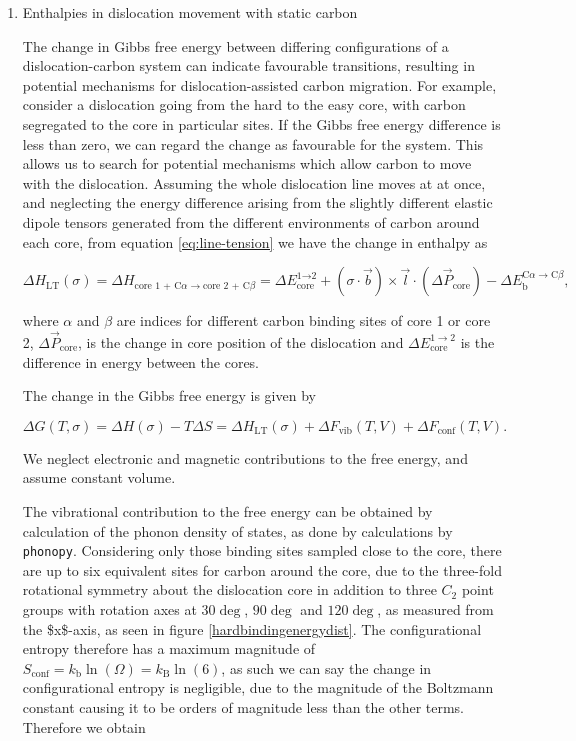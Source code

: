 \documentclass[a4paper,12pt,oneside,print,numbered,index,PageStyleIII]{PhDThesisPSnPDF}
\begin{document}
\begin{enumerate}
\item Enthalpies in dislocation movement with static carbon
\label{sec:org3764bc9}

The change in Gibbs free energy between differing configurations
of a dislocation-carbon system can indicate favourable
transitions, resulting in potential mechanisms for dislocation-assisted carbon
migration. For example, consider a dislocation going from the hard
to the easy core, with carbon segregated to the core in particular
sites. If the Gibbs free energy difference is less than zero, we
can regard the change as favourable for the system. This allows us
to search for potential mechanisms which allow carbon to move with
the dislocation. Assuming the whole dislocation line moves at at
once, and neglecting the energy difference arising from the
slightly different elastic dipole tensors generated from the
different environments of carbon around each core, from equation
\ref{eq:line-tension} we have the change in enthalpy as


    \begin{equation}
\Delta H_{\text{LT} }(\sigma) =      \Delta H_{ \text{core 1 + C}\alpha \rightarrow \text{core 2 + C}\beta }
       =  \Delta E_{\text{core}}^{\text{1} \rightarrow \text{2}}
	   + (\sigma \cdot \vec{b}) \times \vec{l}  \cdot ( \Delta\vec{P}_{\text{core}} )
       - \Delta E_{\text{b}}^{\text{C}\alpha \rightarrow \text{C}\beta},
    \end{equation}

where \(\alpha\) and \(\beta\) are indices for different carbon binding sites of
core 1 or core 2, \(\Delta \vec{P}_{\text{core} }\), is the change in core
position of the dislocation and \(\Delta E^{1\rightarrow 2}_{\text{core} }\)
is the difference in energy between the cores.

The change in the Gibbs free energy is given by

\[\Delta G(T,\sigma) = \Delta H(\sigma) -
     T\Delta S =
     \Delta H_{\text{LT}}(\sigma) + \Delta F_{\text{vib} }(T,V) + \Delta F_{\text{conf} }(T,V).\]

We neglect electronic and magnetic contributions to the free energy, and assume constant volume.

The vibrational contribution to the free energy can be obtained by
calculation of the phonon density of states, as done by
calculations by \texttt{phonopy}. Considering only those binding sites sampled
close to the core, there are up to six equivalent sites for carbon around
the core, due to the three-fold rotational symmetry about the dislocation
core in addition to three \(C_2\) point groups with rotation axes at \(30\deg\), \(90\deg\)
and \(120\deg\), as measured from the \$x\$-axis, as seen in figure
\ref{hardbindingenergydist}. The configurational entropy
therefore has a maximum magnitude of \(S_{\text{conf} } =
     k_{\text{b} }\ln (\Omega) = k_{\text{B}} \ln(6)\), as such we can say the
change in configurational entropy is negligible, due to the magnitude of the
Boltzmann constant causing it to be orders of magnitude less than the other terms. Therefore we obtain


\end{enumerate}
\end{document}
